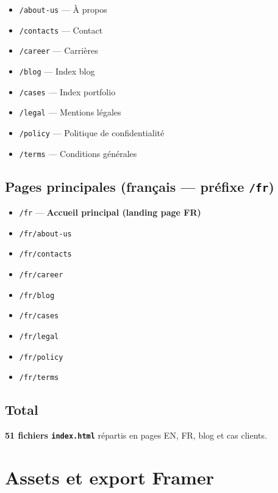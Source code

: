 \documentclass[11pt,a4paper]{report}
\begin{document}
\begin{itemize}[leftmargin=*]
  \item \texttt{/about-us} — À propos
  \item \texttt{/contacts} — Contact
  \item \texttt{/career} — Carrières
  \item \texttt{/blog} — Index blog
  \item \texttt{/cases} — Index portfolio
  \item \texttt{/legal} — Mentions légales
  \item \texttt{/policy} — Politique de confidentialité
  \item \texttt{/terms} — Conditions générales
\end{itemize}

\section{Pages principales (français — préfixe \texttt{/fr})}

\begin{itemize}[leftmargin=*]
  \item \texttt{/fr} — \textbf{Accueil principal (landing page FR)}
  \item \texttt{/fr/about-us}
  \item \texttt{/fr/contacts}
  \item \texttt{/fr/career}
  \item \texttt{/fr/blog}
  \item \texttt{/fr/cases}
  \item \texttt{/fr/legal}
  \item \texttt{/fr/policy}
  \item \texttt{/fr/terms}
\end{itemize}

\section{Total}

\begin{center}
\textbf{51 fichiers \texttt{index.html}} répartis en pages EN, FR, blog et cas clients.
\end{center}

\chapter{Assets et export Framer}
\end{document}
